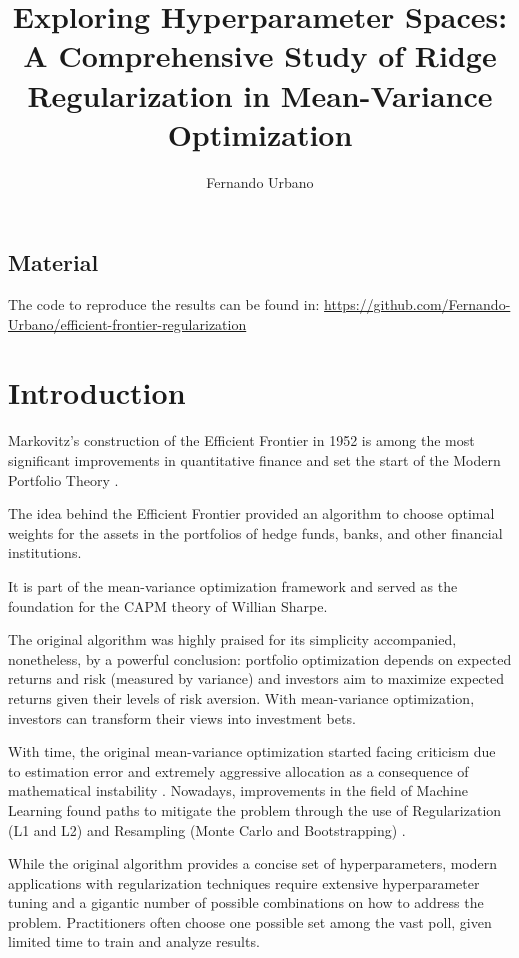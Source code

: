 \documentclass{article}
\title{Exploring Hyperparameter Spaces: A Comprehensive Study of Ridge Regularization in Mean-Variance Optimization}
\author{Fernando Urbano}
\begin{document}
\maketitle

\subsection*{Material}
The code to reproduce the results can be found in: \href{https://github.com/Fernando-Urbano/efficient-frontier-regularization}{https://github.com/Fernando-Urbano/efficient-frontier-regularization}


\section{Introduction}

Markovitz's construction of the Efficient Frontier in 1952 is among the most significant improvements in quantitative finance and set the start of the Modern Portfolio Theory \cite{markowitz1952portfolio}.

The idea behind the Efficient Frontier provided an algorithm to choose optimal weights for the assets in the portfolios of hedge funds, banks, and other financial institutions.

It is part of the mean-variance optimization framework and served as the foundation for the CAPM theory of Willian Sharpe.

The original algorithm was highly praised for its simplicity accompanied, nonetheless, by a powerful conclusion: portfolio optimization depends on expected returns and risk (measured by variance) and investors aim to maximize expected returns given their levels of risk aversion. With mean-variance optimization, investors can transform their views into investment bets.

With time, the original mean-variance optimization started facing criticism due to estimation error and extremely aggressive allocation as a consequence of mathematical instability \cite{schmid2018efficient}. Nowadays, improvements in the field of Machine Learning found paths to mitigate the problem through the use of Regularization (L1 and L2) \cite{britten2013robustifying} and Resampling (Monte Carlo and Bootstrapping) \cite{bruder2013regularization}.

While the original algorithm provides a concise set of hyperparameters, modern applications with regularization techniques require extensive hyperparameter tuning and a gigantic number of possible combinations on how to address the problem. Practitioners often choose one possible set among the vast poll, given limited time to train and analyze results.
\end{document}
